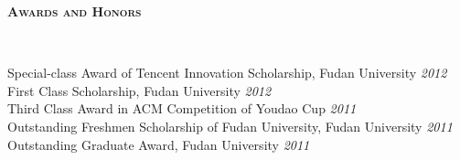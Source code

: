 \documentclass[9pt]{article}
\newenvironment{changemargin}[2]{%
  \begin{list}{}{%
    \setlength{\topsep}{0pt}%
    \setlength{\leftmargin}{#1}%
    \setlength{\rightmargin}{#2}%
    \setlength{\listparindent}{\parindent}%
    \setlength{\itemindent}{\parindent}%
    \setlength{\parsep}{\parskip}%
  }%
  \item[]}{\end{list}
}
\newcommand{\lineover}{
	\begin{changemargin}{-0.05in}{-0.05in}
		\vspace*{-8pt}
		\hrulefill \\
		\vspace*{-2pt}
	\end{changemargin}
}
\newcommand{\header}[1]{
	\begin{changemargin}{-0.5in}{-0.5in}
		\scshape{#1}\\
  	\lineover
	\end{changemargin}
}
\newenvironment{body} {
	\vspace*{-16pt}
	\begin{changemargin}{-0.25in}{-0.5in}
  }	
	{\end{changemargin}
}
\begin{document}
%
%


\header{\textbf{Awards and Honors}}

\begin{body}
	\vspace{14pt}
    Special-class Award of Tencent Innovation Scholarship, Fudan University \hfill{} \emph{2012}\\
    \smallskip
    First Class Scholarship, Fudan University \hfill{} \emph{2012}\\
    \smallskip
    Third Class Award in ACM Competition of Youdao Cup  \hfill{} \emph{2011}\\
    \smallskip
    Outstanding Freshmen Scholarship of Fudan University, Fudan University \hfill{} \emph{2011}\\
    \smallskip
    Outstanding Graduate Award, Fudan University \hfill{} \emph{2011}\\
	\smallskip	
\end{body}
\end{document}
